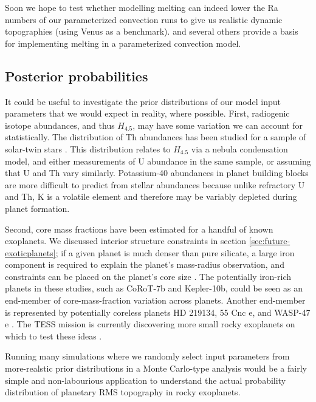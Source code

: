 Soon we hope to test whether modelling melting can indeed lower the Ra numbers of our parameterized convection runs to give us realistic dynamic topographies (using Venus as a benchmark). \citet{Korenaga2009} and several others \citep{Kite2009, Driscoll2014, Tosi2017, Foley2018} provide a basis for implementing melting in a parameterized convection model.




\subsection{Posterior probabilities}

It could be useful to investigate the prior distributions of our model input parameters that we would expect in reality, where possible. First, radiogenic isotope abundances, and thus $H_{4.5}$, may have some variation we can account for statistically. The distribution of Th abundances has been studied for a sample of solar-twin stars \citep[it varies two-fold;][]{Unterborn2015}. This distribution relates to $H_{4.5}$ via a nebula condensation model, and either measurements of U abundance in the same sample, or assuming that U and Th vary similarly. Potassium-40 abundances in planet building blocks are more difficult to predict from stellar abundances because unlike refractory U and Th, K is a volatile element and therefore may be variably depleted during planet formation.

Second, core mass fractions have been estimated for a handful of known exoplanets. We discussed interior structure constraints in section \ref{sec:future-exoticplanets}; if a given planet is much denser than pure silicate, a large iron component is required to explain the planet's mass-radius observation, and constraints can be placed on the planet's core size \citep{Wagner2012, Suissa2018}. The potentially iron-rich planets in these studies, such as CoRoT-7b and Kepler-10b, could be seen as an end-member of core-mass-fraction variation across planets. Another end-member is represented by potentially coreless planets HD 219134, 55 Cnc e, and WASP-47 e \citep{Dorn2019}. The TESS mission is currently discovering more small rocky exoplanets on which to test these ideas \citep[see][]{Jontof-Hutter2019}.

Running many simulations where we randomly select input parameters from more-realstic prior distributions in a Monte Carlo-type analysis \citep[e.g.,][]{Dorn2018a} would be a fairly simple and non-labourious application to understand the actual probability distribution of planetary RMS topography in rocky exoplanets.


